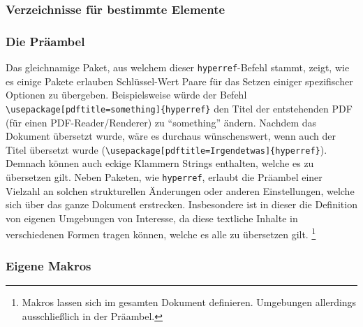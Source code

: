 \subsubsection{Verzeichnisse für bestimmte Elemente}%


\subsubsection{Die Präambel}%

Das gleichnamige Paket, aus welchem dieser \texttt{hyperref}-Befehl stammt, zeigt, wie es einige Pakete erlauben Schlüssel-Wert Paare für das Setzen einiger spezifischer Optionen zu übergeben. Beispielsweise würde der Befehl \verb|\usepackage[pdftitle=something]{hyperref}| den Titel der entstehenden PDF (für einen PDF-Reader/Renderer) zu \enquote{something} ändern. Nachdem das Dokument übersetzt wurde, wäre es durchaus wünschenswert, wenn auch der Titel übersetzt wurde (\verb|\usepackage[pdftitle=Irgendetwas]{hyperref}|). Demnach können auch eckige Klammern Strings enthalten, welche es zu übersetzen gilt. 
Neben Paketen, wie \texttt{hyperref}, erlaubt die Präambel einer Vielzahl an solchen strukturellen Änderungen oder anderen Einstellungen, welche sich über das ganze Dokument erstrecken. 
Insbesondere ist in dieser die Definition von eigenen Umgebungen von Interesse, da diese textliche Inhalte in verschiedenen Formen tragen können, welche es alle zu übersetzen gilt.
\footnote{Makros lassen sich im gesamten Dokument definieren. Umgebungen allerdings ausschließlich in der Präambel.}


\subsubsection{Eigene Makros}
